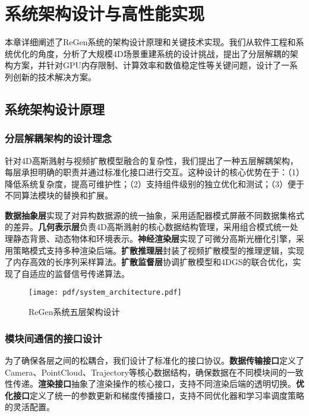 
\chapter{系统架构设计与高性能实现}

本章详细阐述了ReGen系统的架构设计原理和关键技术实现。我们从软件工程和系统优化的角度，分析了大规模4D场景重建系统的设计挑战，提出了分层解耦的架构方案，并针对GPU内存限制、计算效率和数值稳定性等关键问题，设计了一系列创新的技术解决方案。

\section{系统架构设计原理}

\subsection{分层解耦架构的设计理念}

针对4D高斯溅射与视频扩散模型融合的复杂性，我们提出了一种五层解耦架构，每层承担明确的职责并通过标准化接口进行交互。这种设计的核心优势在于：（1）降低系统复杂度，提高可维护性；（2）支持组件级别的独立优化和测试；（3）便于不同算法模块的替换和扩展。

\textbf{数据抽象层}实现了对异构数据源的统一抽象，采用适配器模式屏蔽不同数据集格式的差异。\textbf{几何表示层}负责4D高斯溅射的核心数据结构管理，采用组合模式统一处理静态背景、动态物体和环境表示。\textbf{神经渲染层}实现了可微分高斯光栅化引擎，采用策略模式支持多种渲染后端。\textbf{扩散推理层}封装了视频扩散模型的推理逻辑，实现了内存高效的长序列采样算法。\textbf{扩散监督层}协调扩散模型和4DGS的联合优化，实现了自适应的监督信号传递算法。

\begin{figure}[htbp]
  \centering
  \texttt{[image: pdf/system\_architecture.pdf]}
  \caption{ReGen系统五层架构设计}
  \label{fig:system-architecture}
\end{figure}

\subsection{模块间通信的接口设计}

为了确保各层之间的松耦合，我们设计了标准化的接口协议。\textbf{数据传输接口}定义了Camera、PointCloud、Trajectory等核心数据结构，确保数据在不同模块间的一致性传递。\textbf{渲染接口}抽象了渲染操作的核心接口，支持不同渲染后端的透明切换。\textbf{优化接口}定义了统一的参数更新和梯度传播接口，支持不同优化器和学习率调度策略的灵活配置。

